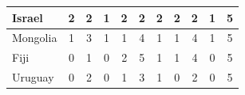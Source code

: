 \documentclass[12pt]{article}  %
\begin{document}
\begin{subappendices}
\begin{longtable}{|l|c|c|c|c|c|c|c|c|c|c|}
	\hline
	Israel                                                         & 2                                                                      & 2                                                                      & 1                                                                      & 2                                                                      & 2                                                                      & 2                                                                      & 2                         & 2                           & 1                           & 5                           \\ 
	\hline
	Mongolia                                                       & 1                                                                      & 3                                                                      & 1                                                                      & 1                                                                      & 4                                                                      & 1                                                                      & 1                         & 4                           & 1                           & 5                           \\ 
	\hline
	Fiji                                                           & 0                                                                      & 1                                                                      & 0                                                                      & 2                                                                      & 5                                                                      & 1                                                                      & 1                         & 4                           & 0                           & 5                           \\ 
	\hline
	Uruguay                                                        & 0                                                                      & 2                                                                      & 0                                                                      & 1                                                                      & 3                                                                      & 1                                                                      & 0                         & 2                           & 0                           & 5                           \\ 

\end{longtable}
\end{subappendices}
\end{document}
